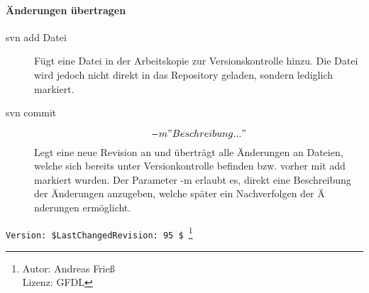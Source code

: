\paragraph[Änderungen übertragen]{Änderungen übertragen}
\begin{description}
	\item[svn add Datei] Fügt eine Datei in der Arbeitskopie zur Versionskontrolle hinzu. Die Datei wird jedoch nicht direkt in das Repository geladen, sondern lediglich markiert.
\end{description}
\begin{description}
	\item[svn commit ] \[-m"Beschreibung..."\] Legt eine neue Revision an und überträgt alle Änderungen an Dateien, welche sich bereits unter Versionkontrolle befinden bzw. vorher mit add markiert wurden. Der Parameter -m erlaubt es, direkt eine Beschreibung der Änderungen anzugeben, welche später ein Nachverfolgen der Ä
	nderungen ermöglicht.
\end{description}

\verb|Version: $LastChangedRevision: 95 $ |\footnote{ Autor: Andreas Frieß\\Lizenz: GFDL}